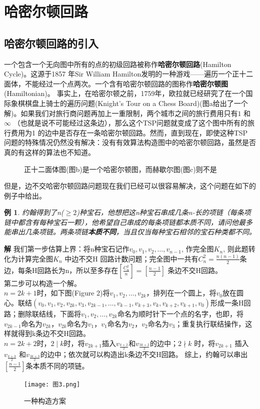 \documentclass[11pt,a4paper,openany]{book}
\newtheorem{sample}{\textbf{例}}[section]
\begin{document}
\section{哈密尔顿回路}
\subsection{哈密尔顿回路的引入} 一个包含一个无向图中所有的点的初级回路被称作\textbf{哈密尔顿回路}(Hamilton Cycle)。这源于1857 年Sir William Hamilton发明的一种游戏——遍历一个正十二面体，不能经过一个点两次。一个含有哈密尔顿回路的图称作\textbf{哈密尔顿图}(Hamiltonian)。 事实上，在哈密尔顿之前，1759年，欧拉就已经研究了在一个国际象棋棋盘上骑士的遍历问题(Knight's Tour on a Chess Board)(图a给出了一个解)。如果我们对旅行商问题再加上一重限制，两个城市之间的旅行费用只有$1$ 和$\infty$ （也就是说不可能经过这条边），那么这个TSP问题就变成了这个图中所有的旅行费用为1 的边中是否存在一条哈密尔顿回路。然而，直到现在，即使这种TSP 问题的特殊情况仍然没有解决：没有有效算法构造图中的哈密尔顿回路，虽然是否真的有这样的算法也不知道。\\
\begin{figure}[H]
\centering
{}
\caption{正十二面体图(图b)是一个哈密尔顿图，而赫歇尔图(图c)则不是}
\label{Fig.lable}
\end{figure}
但是，边不交哈密尔顿回路问题现在我们已经可以很容易解决，这个问题在如下的例子中给出。\\
\begin{sample} {\K 约翰得到了n($\geq 2$)种宝石，他想把这n种宝石串成几条n-长的项链（每条项链中都含有每种宝石一颗），他希望自己串成的每条项链都本质不同，请问他最多能串出几条项链。两条项链\textbf{本质不同}，当且仅当每种宝石相邻的宝石种类都不同。}\end{sample}
\textbf{解} 我们第一步估算上界：将n种宝石记作$v_0,v_1,v_2,\dots,v_{n-1}$, 作完全图$K_n$, 则此题转化为计算完全图$K_n$ 中边不交H 回路计数问题；完全图中一共有$C_{n}^{2}=\frac{n(n-1)}{2}$条边，每条H回路长为n，所以至多存在$[\frac{C_n^2}{n}]=[\frac{n-1}{2}]$ 条边不交H回路。
\\第二步可以构造一个解。\\
$n=2k+1$时，如下图(Figure 2)将$v_1,v_2,\dots,v_{2k}$，排列在一个圆上，将$v_0$放在圆心。联结$(v_0,v_1,v_2,v_{2k},v_3,v_{2k-1},\dots,v_{k-1},v_{k+3},v_{k},v_{k+2},v_{k+1},v_0)$形成一条H回路；删除联结线，下面将$v_1,v_2,\dots,v_{2k}$命名为顺时针下一个点的名字，也即，将$v_{2k-1}$命名为$v_{2k}$，$v_{2k}$命名为$v_1$，$v_1$命名为$v_2$，$v_2$命名为$v_3$；重复执行联结操作，这样就得到k条边不交H回路。\\
$n=2k+2$时，$2\mid k$时，将$v_{2k+1}$插入$v_{\frac{k+2}{2}}$和$v_{\frac{3k+2}{2}}$的边中；$2 \nmid k$ 时，将$v_{2k+1}$ 插入$v_{\frac{k+3}{2}}$ 和$v_{\frac{3k+3}{2}}$的边中；依次就可以构造出k条边不交H回路。
综上，约翰可以串出$[\frac{n-1}{2}]$条本质不同的项链。
\begin{figure}[h]
 \centering
  \texttt{[image: 图3.png]}
  \caption{一种构造方案}\label{Fig.label}
\end{figure}
\end{document}
